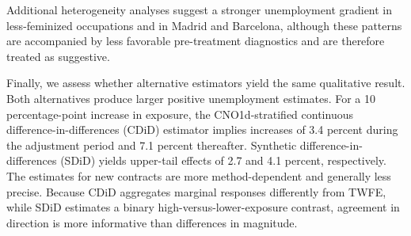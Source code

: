 
Additional heterogeneity analyses suggest a stronger unemployment gradient in less-feminized occupations and in Madrid and Barcelona, although these patterns are accompanied by less favorable pre-treatment diagnostics and are therefore treated as suggestive.

Finally, we assess whether alternative estimators yield the same qualitative result. Both alternatives produce larger positive unemployment estimates. For a 10 percentage-point increase in exposure, the CNO1d-stratified continuous difference-in-differences (CDiD) estimator implies increases of 3.4 percent during the adjustment period and 7.1 percent thereafter. Synthetic difference-in-differences (SDiD) yields upper-tail effects of 2.7 and 4.1 percent, respectively. The estimates for new contracts are more method-dependent and generally less precise. Because CDiD aggregates marginal responses differently from TWFE, while SDiD estimates a binary high-versus-lower-exposure contrast, agreement in direction is more informative than differences in magnitude.

